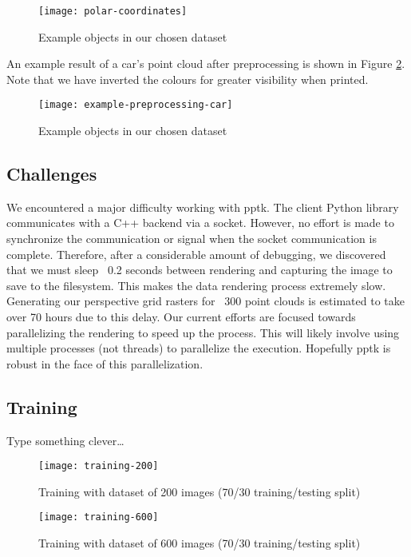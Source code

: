 \documentclass[runningheads,a4paper]{llncs}
\begin{document}
\begin{figure}[h]
  \caption{Example objects in our chosen dataset}
  \centering
  \texttt{[image: polar-coordinates]}
  \label{fig:polar-coordinates}
\end{figure}

An example result of a car’s point cloud after preprocessing is shown in Figure
\ref{fig:example-preprocessing}. Note that we have inverted the colours for greater
visibility when printed.

\begin{figure}[h]
  \caption{Example objects in our chosen dataset}
  \centering
  \texttt{[image: example-preprocessing-car]}
  \label{fig:example-preprocessing}
\end{figure}

\subsection{Challenges}
We encountered a major difficulty working with pptk. The client Python library
communicates with a C++ backend via a socket. However, no effort is made to
synchronize the communication or signal when the socket communication is
complete. Therefore, after a considerable amount of debugging, we discovered
that we must sleep ~0.2 seconds between rendering and capturing the image to
save to the filesystem. This makes the data rendering process extremely slow.
Generating our perspective grid rasters for ~300 point clouds is estimated to
take over 70 hours due to this delay. Our current efforts are focused towards
parallelizing the rendering to speed up the process. This will likely involve
using multiple processes (not threads) to parallelize the execution. Hopefully
pptk is robust in the face of this parallelization.

\subsection{Training}
Type something clever\dots

\begin{figure}[h]
  \caption{Training with dataset of 200 images (70/30 training/testing split)}
  \centering
  \texttt{[image: training-200]}
  \label{fig:training-200}
\end{figure}

\begin{figure}[h]
  \caption{Training with dataset of 600 images (70/30 training/testing split)}
  \centering
  \texttt{[image: training-600]}
  \label{fig:training-600}
\end{figure}
\end{document}
